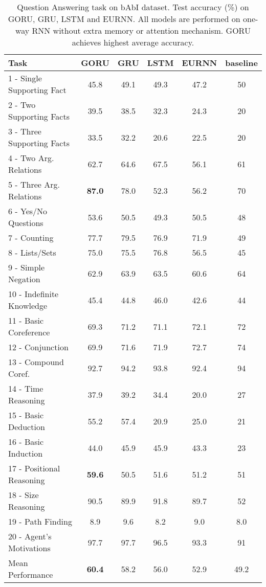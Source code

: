 \documentclass[letterpaper]{article} \usepackage{aaai18}  \usepackage{times}  \usepackage{helvet}  \usepackage{courier}  \usepackage{url}  \usepackage{graphicx}
\begin{document}
\begin{table*}[!htb]
\centering
\begin{tabular}{lccccc}
\hline
Task           & GORU & GRU & LSTM & EURNN &  baseline \cite{weston2015towards}\\
\hline
1 - Single Supporting Fact	&	45.8	&	49.1	&	49.3	&	47.2	&	50	\\
2 - Two Supporting Facts	& 	39.5	&	38.5	&	32.3	&	24.3	&	20	\\
3 - Three Supporting Facts	&	33.5	&	32.2	&	20.6	&	22.5	&	20	\\
4 - Two Arg. Relations	&	62.7	&	64.6	&	67.5	&	56.1		&	61	\\
5 - Three Arg. Relations	&	\textbf{87.0}	&	78.0	&	52.3	&	56.2	&	70	\\
6 - Yes/No Questions	&	53.6	&	50.5	&	49.3	&	50.5	&	48	\\
7 - Counting	&	77.7		&	79.5	&	76.9	&	71.9	&	49	\\
8 - Lists/Sets	&	75.0	&	75.5	&	76.8	&	56.5	&	45	\\
9 - Simple Negation	&	62.9	&	63.9	&	63.5	&	60.6	&	64	\\
10 - Indefinite Knowledge	&	45.4	&	44.8	&	46.0	&	42.6	&	44	\\
11 - Basic Coreference	&	69.3	&	71.2	&	71.1	&	72.1	&	72	\\
12 - Conjunction	&	69.9	&	71.6	&	71.9	&	72.7	&	74	\\
13 - Compound Coref.	&	92.7	&	94.2	&	93.8	&	92.4	&	94	\\
14 - Time Reasoning	&	37.9	&	39.2	&	34.4	&	20.0	&	27	\\
15 - Basic Deduction	&	55.2	&	57.4	&	20.9	&	25.0	&	21	\\
16 - Basic Induction	&	44.0	&	45.9	&	45.9	&	43.3	&	23	\\
17 - Positional Reasoning	&	\textbf{59.6}	&	50.5	&	51.6	&	51.2	&	51	\\
18 - Size Reasoning	&	90.5	&	89.9	&	91.8	&	89.7		&	52	\\
19 - Path Finding	&	8.9		&	9.6		&	8.2		&	9.0	&	8.0	\\
20 - Agent's Motivations	&	97.7	&	97.7	&	96.5	&	93.3	&	91		\\
\hline
Mean Performance	&	\textbf{60.4}	&	58.2	&	56.0	&	52.9	&	49.2		\\
\hline
\end{tabular}
\caption{Question Answering task on bAbI dataset. Test accuracy (\%) on GORU, GRU, LSTM and EURNN. All models are performed on one-way RNN without extra memory or attention mechanism. GORU achieves highest average accuracy.}
\label{tbl:babi}
\end{table*}
\end{document}
